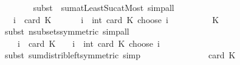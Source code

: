 \begin{isabellebody}
\ \ \ \ \ \ \isamarkupfalse%
\ {\isacharparenleft}{\kern0pt}subst\ {\isacharparenleft}{\kern0pt}{}{\isacharparenright}{\kern0pt}\ sum{\isachardot}{\kern0pt}atLeast{\isacharunderscore}{\kern0pt}Suc{\isacharunderscore}{\kern0pt}atMost{\isacharparenright}{\kern0pt}\ simp{\isacharunderscore}{\kern0pt}all\isanewline
\ \ \ \ \isamarkupfalse%
\ \isamarkupfalse%
\ {\isachardoublequoteopen}{\isasymdots}\ {\isacharequal}{\kern0pt}\ {\isacharparenleft}{\kern0pt}{\isasymSum}i\ {\isacharequal}{\kern0pt}\ {}{\isachardot}{\kern0pt}{\isachardot}{\kern0pt}card\ K{\isachardot}{\kern0pt}\ {\isacharparenleft}{\kern0pt}{\isacharminus}{\kern0pt}\ {}{\isacharparenright}{\kern0pt}\ {\isacharasterisk}{\kern0pt}\ {\isacharparenleft}{\kern0pt}{\isacharparenleft}{\kern0pt}{\isacharminus}{\kern0pt}\ {}{\isacharparenright}{\kern0pt}\ {\isacharcircum}{\kern0pt}\ i\ {\isacharasterisk}{\kern0pt}\ int\ {\isacharparenleft}{\kern0pt}card\ K\ choose\ i{\isacharparenright}{\kern0pt}{\isacharparenright}{\kern0pt}{\isacharparenright}{\kern0pt}\ {\isacharplus}{\kern0pt}\ {}{\isachardoublequoteclose}\isanewline
\ \ \ \ \ \ \isamarkupfalse%
\ K\ \isamarkupfalse%
\ {\isacharparenleft}{\kern0pt}subst\ n{\isacharunderscore}{\kern0pt}subsets{\isacharbrackleft}{\kern0pt}symmetric{\isacharbrackright}{\kern0pt}{\isacharparenright}{\kern0pt}\ simp{\isacharunderscore}{\kern0pt}all\isanewline
\ \ \ \ \isamarkupfalse%
\ \isamarkupfalse%
\ {\isachardoublequoteopen}{\isasymdots}\ {\isacharequal}{\kern0pt}\ {\isacharminus}{\kern0pt}\ {\isacharparenleft}{\kern0pt}{\isasymSum}i\ {\isacharequal}{\kern0pt}\ {}{\isachardot}{\kern0pt}{\isachardot}{\kern0pt}card\ K{\isachardot}{\kern0pt}\ {\isacharparenleft}{\kern0pt}{\isacharminus}{\kern0pt}\ {}{\isacharparenright}{\kern0pt}\ {\isacharcircum}{\kern0pt}\ i\ {\isacharasterisk}{\kern0pt}\ int\ {\isacharparenleft}{\kern0pt}card\ K\ choose\ i{\isacharparenright}{\kern0pt}{\isacharparenright}{\kern0pt}\ {\isacharplus}{\kern0pt}\ {}{\isachardoublequoteclose}\isanewline
\ \ \ \ \ \ \isamarkupfalse%
\ {\isacharparenleft}{\kern0pt}subst\ sum{\isacharunderscore}{\kern0pt}distrib{\isacharunderscore}{\kern0pt}left{\isacharbrackleft}{\kern0pt}symmetric{\isacharbrackright}{\kern0pt}{\isacharparenright}{\kern0pt}\ simp\isanewline
\ \ \ \ \isamarkupfalse%
\ \isamarkupfalse%
\ {\isachardoublequoteopen}{\isasymdots}\ {\isacharequal}{\kern0pt}\ \ {\isacharminus}{\kern0pt}\ {\isacharparenleft}{\kern0pt}{\isacharparenleft}{\kern0pt}{\isacharminus}{\kern0pt}{}\ {\isacharplus}{\kern0pt}\ {}{\isacharparenright}{\kern0pt}\ {\isacharcircum}{\kern0pt}\ card\ K{\isacharparenright}{\kern0pt}\ {\isacharplus}{\kern0pt}\ {}{\isachardoublequoteclose}\isanewline

\end{isabellebody}
